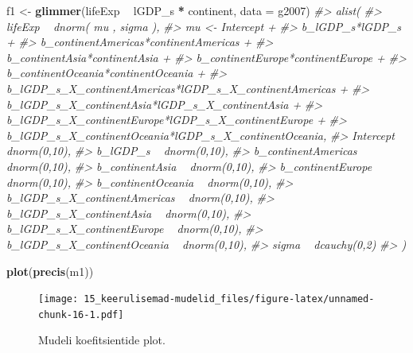 \documentclass[]{book}
\newenvironment{Shaded}{\begin{snugshade}}{\end{snugshade}}
\newcommand{\CommentTok}[1]{\textcolor[rgb]{0.56,0.35,0.01}{\textit{#1}}}
\newcommand{\DataTypeTok}[1]{\textcolor[rgb]{0.13,0.29,0.53}{#1}}
\newcommand{\KeywordTok}[1]{\textcolor[rgb]{0.13,0.29,0.53}{\textbf{#1}}}
\newcommand{\NormalTok}[1]{#1}
\newcommand{\OperatorTok}[1]{\textcolor[rgb]{0.81,0.36,0.00}{\textbf{#1}}}
\newcommand{\StringTok}[1]{\textcolor[rgb]{0.31,0.60,0.02}{#1}}
\begin{document}
\begin{Shaded}
\begin{Highlighting}[]
\NormalTok{f1 <-}\StringTok{ }\KeywordTok{glimmer}\NormalTok{(lifeExp }\OperatorTok{~}\StringTok{ }\NormalTok{lGDP_s }\OperatorTok{*}\StringTok{ }\NormalTok{continent, }\DataTypeTok{data =}\NormalTok{ g2007)}
\CommentTok{#> alist(}
\CommentTok{#>     lifeExp ~ dnorm( mu , sigma ),}
\CommentTok{#>     mu <- Intercept +}
\CommentTok{#>         b_lGDP_s*lGDP_s +}
\CommentTok{#>         b_continentAmericas*continentAmericas +}
\CommentTok{#>         b_continentAsia*continentAsia +}
\CommentTok{#>         b_continentEurope*continentEurope +}
\CommentTok{#>         b_continentOceania*continentOceania +}
\CommentTok{#>         b_lGDP_s_X_continentAmericas*lGDP_s_X_continentAmericas +}
\CommentTok{#>         b_lGDP_s_X_continentAsia*lGDP_s_X_continentAsia +}
\CommentTok{#>         b_lGDP_s_X_continentEurope*lGDP_s_X_continentEurope +}
\CommentTok{#>         b_lGDP_s_X_continentOceania*lGDP_s_X_continentOceania,}
\CommentTok{#>     Intercept ~ dnorm(0,10),}
\CommentTok{#>     b_lGDP_s ~ dnorm(0,10),}
\CommentTok{#>     b_continentAmericas ~ dnorm(0,10),}
\CommentTok{#>     b_continentAsia ~ dnorm(0,10),}
\CommentTok{#>     b_continentEurope ~ dnorm(0,10),}
\CommentTok{#>     b_continentOceania ~ dnorm(0,10),}
\CommentTok{#>     b_lGDP_s_X_continentAmericas ~ dnorm(0,10),}
\CommentTok{#>     b_lGDP_s_X_continentAsia ~ dnorm(0,10),}
\CommentTok{#>     b_lGDP_s_X_continentEurope ~ dnorm(0,10),}
\CommentTok{#>     b_lGDP_s_X_continentOceania ~ dnorm(0,10),}
\CommentTok{#>     sigma ~ dcauchy(0,2)}
\CommentTok{#> )}
\end{Highlighting}
\end{Shaded}

\begin{Shaded}
\end{Shaded}

\begin{Shaded}
\begin{Highlighting}[]
\KeywordTok{plot}\NormalTok{(}\KeywordTok{precis}\NormalTok{(m1))}
\end{Highlighting}
\end{Shaded}

\begin{figure}
\centering
\texttt{[image: 15\_keerulisemad-mudelid\_files/figure-latex/unnamed-chunk-16-1.pdf]}
\caption{\label{fig:unnamed-chunk-16}Mudeli koefitsientide plot.}
\end{figure}
\end{document}
